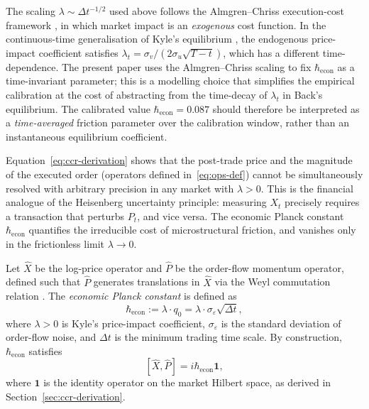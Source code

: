 \begin{remark}
\label{rem:back-scaling}
The scaling $\lambda \sim \Delta t^{-1/2}$ used above follows the Almgren--Chriss
execution-cost framework \citep{almgren2005direct}, in which market impact is an
\emph{exogenous} cost function. In the continuous-time generalisation of Kyle's
equilibrium \citep{kyle1985continuous}, the endogenous price-impact coefficient satisfies
$\lambda_t = \sigma_v / (2\sigma_u \sqrt{T-t})$, which has a different time-dependence.
The present paper uses the Almgren--Chriss scaling to fix $\hbar_{\mathrm{econ}}$
as a time-invariant parameter; this is a modelling choice that simplifies the empirical
calibration at the cost of abstracting from the time-decay of $\lambda_t$ in Back's
equilibrium. The calibrated value $\hbar_{\mathrm{econ}} = 0.087$ should therefore
be interpreted as a \emph{time-averaged} friction parameter over the calibration
window, rather than an instantaneous equilibrium coefficient.
\end{remark}

\begin{remark}[Interpretation]
Equation~\eqref{eq:ccr-derivation} shows that the post-trade price and the
magnitude of the executed order (operators defined in~\eqref{eq:ops-def}) cannot
be simultaneously resolved with arbitrary
precision in any market with $\lambda > 0$. This is the financial analogue of
the Heisenberg uncertainty principle: measuring $X_t$ precisely requires a
transaction that perturbs $P_t$, and vice versa. The economic Planck constant
$\hbar_{\mathrm{econ}}$ quantifies the irreducible cost of microstructural
friction, and vanishes only in the frictionless limit $\lambda \to 0$.
\end{remark}


\begin{definition}\label{def:hbar-econ}
Let $\hat{X}$ be the log-price operator and $\hat{P}$ be the order-flow momentum
operator, defined such that $\hat{P}$ generates translations in $\hat{X}$ via the
Weyl commutation relation \citep{Weyl1927}. The \emph{economic Planck constant}
is defined as
\begin{equation}\label{eq:hbar-def}
    \hbar_{\mathrm{econ}} := \lambda \cdot q_0
    = \lambda \cdot \sigma_\varepsilon \sqrt{\Delta t},
\end{equation}
where $\lambda > 0$ is Kyle's price-impact coefficient, $\sigma_\varepsilon$ is
the standard deviation of order-flow noise, and $\Delta t$ is the minimum
trading time scale. By construction, $\hbar_{\mathrm{econ}}$ satisfies
\begin{equation}\label{eq:ccr}
    [\hat{X}, \hat{P}] = i\hbar_{\mathrm{econ}} \mathbf{1},
\end{equation}
where $\mathbf{1}$ is the identity operator on the market Hilbert space, as
derived in Section~\ref{sec:ccr-derivation}.
\end{definition}

